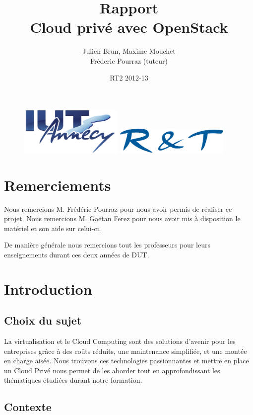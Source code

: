 \documentclass{report}
\title{Rapport \\ \og Cloud privé avec OpenStack \fg}
\author{Julien Brun, Maxime Mouchet \\ Fréderic Pourraz (tuteur)}
\date{RT2 2012-13}
\begin{document}
\begin{figure}
\includegraphics[width=5cm]{images/iut.png}\hfill
\includegraphics[width=5.5cm]{images/rt.png}
\end{figure}

\maketitle

\clearpage
\thispagestyle{empty}
\null\newpage

\chapter*{Remerciements}
\thispagestyle{empty}
Nous remercions M. Frédéric Pourraz pour nous avoir permis de réaliser ce projet.\newline
Nous remercions M. Gaëtan Ferez pour nous avoir mis à disposition le matériel et son aide sur celui-ci.

De manière générale nous remercions tout les professeurs pour leurs enseignements durant ces deux années de DUT.

\renewcommand{\contentsname}{Sommaire}
\tableofcontents

\chapter{Introduction}
\section{Choix du sujet}
La virtualisation et le Cloud Computing sont des solutions d'avenir pour les entreprises grâce à des coûts réduits, une maintenance simplifiée, et une montée en charge aisée. Nous trouvons ces technologies passionnantes et mettre en place un Cloud Privé nous permet de les aborder tout en approfondissant les thématiques étudiées durant notre formation.

\section{Contexte}
\end{document}
